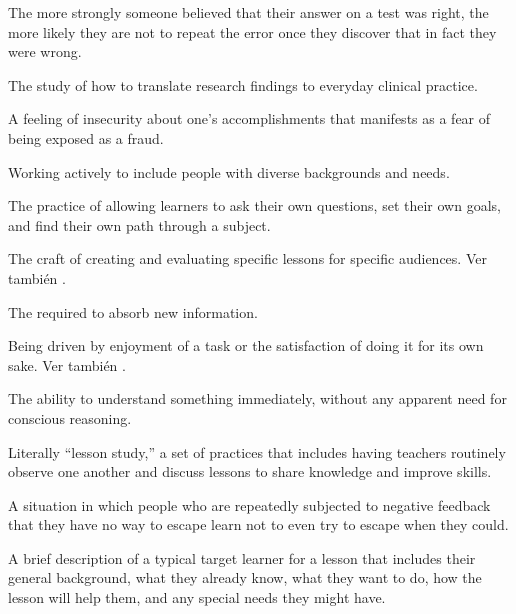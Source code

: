 \begin{description}
 The more strongly someone
believed that their answer on a test was right, the more likely they are not to
repeat the error once they discover that in fact they were wrong.

 The study of how to
translate research findings to everyday clinical practice.

 A feeling of insecurity about
one's accomplishments that manifests as a fear of being exposed as a fraud.

 Working actively to include people with
diverse backgrounds and needs.

 The practice of
allowing learners to ask their own questions, set their own goals, and find
their own path through a subject.

 The craft of creating and
evaluating specific lessons for specific audiences. Ver también
.

 The 
required to absorb new information.

 Being driven by enjoyment
of a task or the satisfaction of doing it for its own sake.  Ver también
.

 The ability to understand something immediately,
without any apparent need for conscious reasoning.

 Literally ``lesson study,'' a set of
practices that includes having teachers routinely observe one another and
discuss lessons to share knowledge and improve skills.

 A situation in which
people who are repeatedly subjected to negative feedback that they have no way
to escape learn not to even try to escape when they could.

 A brief description of a typical
target learner for a lesson that includes their general background, what they
already know, what they want to do, how the lesson will help them, and any
special needs they might have.


\end{description}

